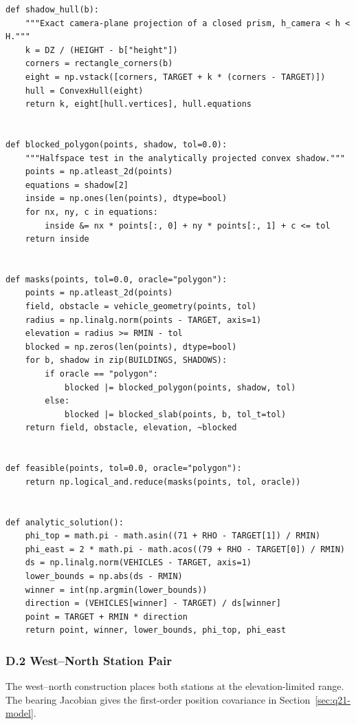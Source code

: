 \documentclass{swmcmthesis}
\begin{document}
\noindent{}
\begin{lstlisting}
def shadow_hull(b):
    """Exact camera-plane projection of a closed prism, h_camera < h < H."""
    k = DZ / (HEIGHT - b["height"])
    corners = rectangle_corners(b)
    eight = np.vstack([corners, TARGET + k * (corners - TARGET)])
    hull = ConvexHull(eight)
    return k, eight[hull.vertices], hull.equations


def blocked_polygon(points, shadow, tol=0.0):
    """Halfspace test in the analytically projected convex shadow."""
    points = np.atleast_2d(points)
    equations = shadow[2]
    inside = np.ones(len(points), dtype=bool)
    for nx, ny, c in equations:
        inside &= nx * points[:, 0] + ny * points[:, 1] + c <= tol
    return inside


def masks(points, tol=0.0, oracle="polygon"):
    points = np.atleast_2d(points)
    field, obstacle = vehicle_geometry(points, tol)
    radius = np.linalg.norm(points - TARGET, axis=1)
    elevation = radius >= RMIN - tol
    blocked = np.zeros(len(points), dtype=bool)
    for b, shadow in zip(BUILDINGS, SHADOWS):
        if oracle == "polygon":
            blocked |= blocked_polygon(points, shadow, tol)
        else:
            blocked |= blocked_slab(points, b, tol_t=tol)
    return field, obstacle, elevation, ~blocked


def feasible(points, tol=0.0, oracle="polygon"):
    return np.logical_and.reduce(masks(points, tol, oracle))


def analytic_solution():
    phi_top = math.pi - math.asin((71 + RHO - TARGET[1]) / RMIN)
    phi_east = 2 * math.pi - math.acos((79 + RHO - TARGET[0]) / RMIN)
    ds = np.linalg.norm(VEHICLES - TARGET, axis=1)
    lower_bounds = np.abs(ds - RMIN)
    winner = int(np.argmin(lower_bounds))
    direction = (VEHICLES[winner] - TARGET) / ds[winner]
    point = TARGET + RMIN * direction
    return point, winner, lower_bounds, phi_top, phi_east
\end{lstlisting}

\subsubsection*{D.2 West--North Station Pair}

The west--north construction places both stations at the elevation-limited range. The bearing Jacobian gives the first-order position covariance in Section~\ref{sec:q21-model}.
\end{document}
